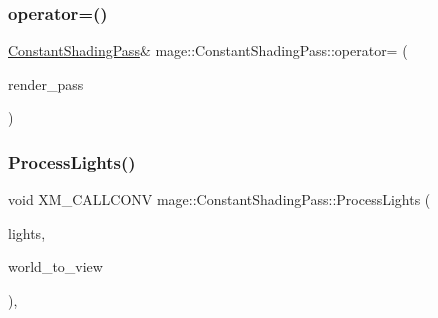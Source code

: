 \hypertarget{classmage_1_1_constant_shading_pass_ae5ea38d9739b1a16257ee0a69c95b406}{}\label{classmage_1_1_constant_shading_pass_ae5ea38d9739b1a16257ee0a69c95b406} 
\subsubsection{\texorpdfstring{operator=()}{operator=()}\hspace{0.1cm}{\footnotesize\ttfamily [2/2]}}
{\footnotesize\ttfamily \hyperlink{classmage_1_1_constant_shading_pass}{Constant\+Shading\+Pass}\& mage\+::\+Constant\+Shading\+Pass\+::operator= (\begin{DoxyParamCaption}\item[{\hyperlink{classmage_1_1_constant_shading_pass}{Constant\+Shading\+Pass} \&\&}]{render\+\_\+pass }\end{DoxyParamCaption})\hspace{0.3cm}{\ttfamily [delete]}}

\hypertarget{classmage_1_1_constant_shading_pass_a948d1258f9bafad1be72765f8021b4ca}{}\label{classmage_1_1_constant_shading_pass_a948d1258f9bafad1be72765f8021b4ca} 
\subsubsection{\texorpdfstring{Process\+Lights()}{ProcessLights()}\hspace{0.1cm}{\footnotesize\ttfamily [1/3]}}
{\footnotesize\ttfamily void X\+M\+\_\+\+C\+A\+L\+L\+C\+O\+NV mage\+::\+Constant\+Shading\+Pass\+::\+Process\+Lights (\begin{DoxyParamCaption}\item[{const vector$<$ const \hyperlink{namespacemage_a7637b5351fc0f66a10badd80ebb35899}{Directional\+Light\+Node} $\ast$ $>$ \&}]{lights,  }\item[{F\+X\+M\+M\+A\+T\+R\+IX}]{world\+\_\+to\+\_\+view }\end{DoxyParamCaption})\hspace{0.3cm}{\ttfamily [private]}, {\ttfamily [noexcept]}}

\hypertarget{classmage_1_1_constant_shading_pass_a61dad88b377d045e2757606f911a7d47}{}\label{classmage_1_1_constant_shading_pass_a61dad88b377d045e2757606f911a7d47} 
